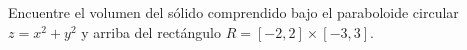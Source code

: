 \item Encuentre el volumen del sólido comprendido bajo el paraboloide circular $z = x^2 + y^2$ y arriba del rectángulo $R = [-2, 2] \times [-3, 3]$.
